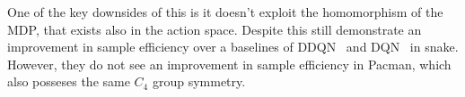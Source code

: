 One of the key downsides of this is it doesn't exploit the homomorphism of the MDP, that exists also in the action space. Despite this \cite{mondal2020group} still demonstrate an improvement in sample efficiency over a baselines of DDQN~\cite{van2016deep} and DQN~\cite{mnih2013playing} in snake. However, they do not see an improvement in sample efficiency in Pacman, which also posseses the same $C_4$ group symmetry.